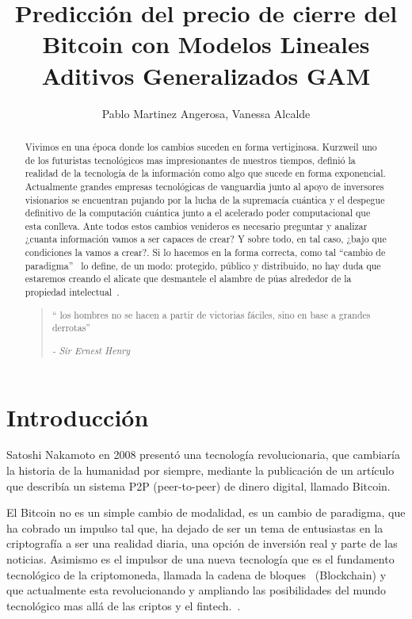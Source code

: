 \documentclass[a4paper,12pt,twocolumn]{article}
\date{ }
\title{\textbf{Predicción del precio de cierre del Bitcoin con Modelos Lineales Aditivos Generalizados GAM}}
\author{Pablo Martinez Angerosa, Vanessa Alcalde}
\begin{document}
\onecolumn

\maketitle
\begin{abstract}
Vivimos en una época donde los cambios suceden en forma vertiginosa. Kurzweil\cite{RayKurzweil} uno de los futuristas tecnológicos mas impresionantes de nuestros tiempos, definió la realidad de la tecnología de la información como algo que sucede en forma exponencial. Actualmente grandes empresas tecnológicas de vanguardia junto al apoyo de inversores visionarios se encuentran pujando por la lucha de la supremacía cuántica y el despegue definitivo de la computación cuántica junto a el  acelerado poder computacional que esta conlleva. Ante todos estos cambios venideros es necesario preguntar y analizar ¿cuanta información vamos a ser capaces de crear? Y sobre todo, en tal caso, ¿bajo que condiciones la vamos a crear?. Si lo hacemos en la forma correcta, como tal “cambio de paradigma”~\cite{LaSingularidad} lo define, de un modo: protegido, público y distribuido,  no hay duda que estaremos creando el alicate que desmantele el alambre de púas alrededor de la propiedad intelectual~\cite{ManifestoCriptoAnarquista}.
\begin{quotation}
“ los hombres no se hacen a partir de victorias fáciles, sino en base a grandes derrotas”
\begin{flushright}
{\it - Sir Ernest Henry }
\end{flushright}
\end{quotation}

\end{abstract}
\vspace{1.0cm}

\twocolumn

\section{Introducción}
 Satoshi Nakamoto en 2008 presentó una tecnología revolucionaria\cite{Satoshi}, que cambiaría la historia de la humanidad por siempre, mediante la publicación de un artículo que describía un sistema P2P (peer-to-peer) de dinero digital, llamado Bitcoin. 

El Bitcoin no es un simple cambio de modalidad, es un cambio de paradigma, que ha cobrado un impulso tal que, ha dejado de ser un tema de entusiastas en la criptografía a ser una realidad diaria, una opción de inversión real y parte de las noticias. Asimismo es el impulsor de una nueva tecnología que es el fundamento tecnológico de la criptomoneda, llamada la cadena de bloques~\cite{Blockchain} (Blockchain) y que actualmente esta revolucionando y ampliando las posibilidades del mundo tecnológico mas allá de las criptos y el fintech.~\cite{Bitcoin_revolucion_monetaria}. 
\end{document}
